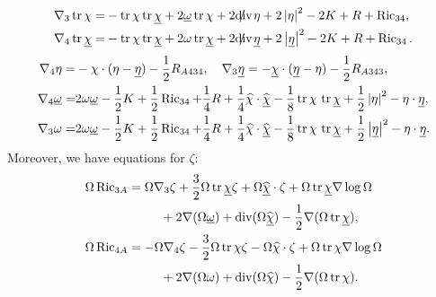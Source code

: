 \begin{equation}
    \begin{aligned}
        \nabla_3 \operatorname{tr} \chi 
        =&-\tr\chi\tr\chib+2\omegab\tr\chi+2\sdiv\eta+2\left|\eta\right|^2-2K+R+\Rc_{34}, \\
        \nabla_4 \operatorname{tr} \underline{\chi} 
        =&-\tr\chi\tr\chib+2\omega\tr\chib+2\sdiv\etab+2\left|\etab\right|^2-2K+R+\Rc_{34}.
    \end{aligned}
\end{equation} 
\begin{equation}\label{eq:Ricci_coefficients_propagation_3}
    \begin{aligned}
        \nabla_4 \eta=&-\chi \cdot(\eta-\underline{\eta})-\frac{1}{2} R_{A 434}, \quad
        \nabla_3 \underline{\eta}=-\underline{\chi} \cdot(\underline{\eta}-\eta)-\frac{1}{2} R_{A 343}, \\
        \nabla_4 \underline{\omega} 
        =&2\omega\underline\omega-\frac{1}{2}  K+\frac{1}{2} \operatorname{Ric}_{34}+\frac{1}{4} R +\frac{1}{4}\widehat\chi\cdot\widehat{\underline\chi}-\frac{1}{8}\operatorname{tr}\chi\,\operatorname{tr}\underline\chi+\frac{1}{2}\left|\eta\right|^2-\eta\cdot\underline\eta, \\
        \nabla_3 \omega 
        =&2\omega\underline\omega-\frac{1}{2}  K+\frac{1}{2} \operatorname{Ric}_{34}+\frac{1}{4} R +\frac{1}{4}\widehat\chi\cdot\widehat{\underline\chi}-\frac{1}{8}\operatorname{tr}\chi\,\operatorname{tr}\underline\chi+\frac{1}{2}\left|\underline\eta\right|^2-\eta\cdot\underline\eta.
    \end{aligned}
\end{equation}
Moreover, we have equations for $\zeta$:
\begin{equation}\label{eq:Ricci_coefficients_propagation_4}
    \begin{aligned}
        &\Omega\operatorname{Ric}_{3A}=\Omega\nabla_3\zeta+\frac{3}{2}\Omega\operatorname{tr}\underline\chi\zeta+\Omega\widehat{\underline\chi}\cdot\zeta+\Omega\operatorname{tr}\underline\chi\nabla\log\Omega\\
        &\qquad\qquad\qquad+2\nabla(\Omega\underline\omega)+\operatorname{div}(\Omega\widehat{\underline\chi})-\frac{1}{2}\nabla(\Omega\operatorname{tr}\underline\chi),\\
        &\Omega\operatorname{Ric}_{4A}=-\Omega\nabla_4\zeta-\frac{3}{2}\Omega\operatorname{tr}\chi\zeta-\Omega\widehat\chi\cdot\zeta+\Omega\operatorname{tr}\chi\nabla\log\Omega\\
        &\qquad\qquad\qquad+2\nabla(\Omega\omega)+\operatorname{div}(\Omega\widehat\chi)-\frac{1}{2}\nabla(\Omega\operatorname{tr}\chi).
    \end{aligned}
\end{equation}
